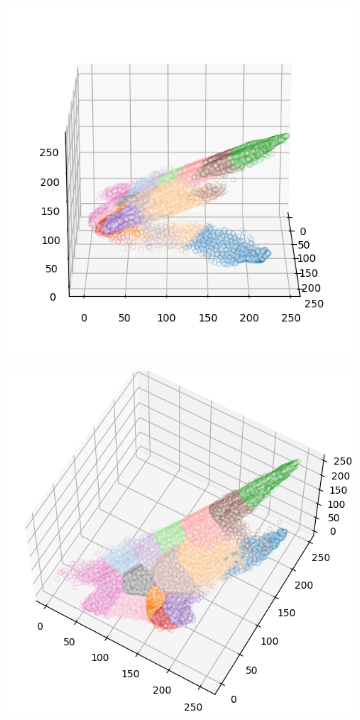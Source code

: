 \begin{figure}[htbp]
\begin{subfigure}[t]{0.32\textwidth}
    \end{subfigure}
    \begin{subfigure}[t]{0.32\textwidth}
        \includegraphics[width=\linewidth]{../../python_code/plots/kmeans/cat-110/clusters_elev20_azim0.png}
    \end{subfigure}
    \begin{subfigure}[t]{0.32\textwidth}
        \includegraphics[width=\linewidth]{../../python_code/plots/kmeans/cat-110/clusters_elev60_azim-60.png}

\end{subfigure}
\end{figure}
